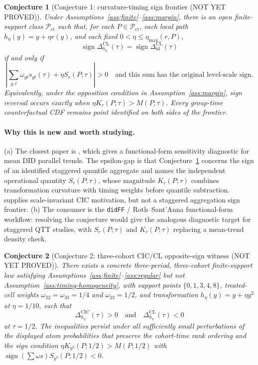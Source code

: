 \documentclass[11pt]{article}
\theoremstyle{definition}
\theoremstyle{plain}
\newtheorem{conjecture}{Conjecture}
\theoremstyle{remark}
\begin{document}
\begin{conjecture}[Conjecture 1: curvature-timing sign frontier (NOT YET PROVED)]\label{conj:curvature-frontier}
Under Assumptions~\ref{ass:finite}--\ref{ass:margin}, there is an open
finite-support class \(\mathcal P_{\mathrm{ct}}\) such that, for each
\(P\in\mathcal P_{\mathrm{ct}}\), each local path \(h_\eta(y)=y+\eta r(y)\), and
each fixed \(0<\eta\le\eta_{\max}(r,P)\),
\[
\operatorname{sign}\Delta^{\mathrm{CL}}_{h_\eta}(\tau)
=\operatorname{sign}\Delta^{\mathrm{CL}}_{\mathrm{id}}(\tau)
\]
if and only if
\[
\left|\sum_{g,t}\omega_{gt}s_{gt}(\tau)+\eta S_r(P;\tau)\right|>0
\quad\text{and this sum has the original level-scale sign.}
\]
Equivalently, under the opposition condition in Assumption~\ref{ass:margin},
sign reversal occurs exactly when \(\eta K_r(P;\tau)>M(P;\tau)\).  Every
group-time counterfactual CDF remains point identified on both sides of the
frontier.
\end{conjecture}
\paragraph{Why this is new and worth studying.}
(a) The closest paper is \citet{RothSantAnna2023}, which gives a functional-form
sensitivity diagnostic for mean DID parallel trends.  The epsilon-gap is that
Conjecture~\ref{conj:curvature-frontier} concerns the sign of an identified
staggered quantile aggregate and names the independent operational quantity
\(S_r(P;\tau)\), whose magnitude \(K_r(P;\tau)\) combines transformation
curvature with timing weights before quantile subtraction.  \citet{AtheyImbens2006} supplies scale-invariant CIC
motivation, but not a staggered aggregation sign frontier.  (b) The consumer is
the \texttt{didFF} / Roth--Sant'Anna functional-form workflow: resolving the
conjecture would give the analogous diagnostic target for staggered QTT studies,
with \(S_r(P;\tau)\) and \(K_r(P;\tau)\) replacing a mean-trend density check.

\begin{conjecture}[Conjecture 2: three-cohort CIC/CL opposite-sign witness (NOT YET PROVED)]\label{conj:witness}
There exists a concrete three-period, three-cohort finite-support law satisfying
Assumptions~\ref{ass:finite}--\ref{ass:regular} but not
Assumption~\ref{ass:timing-homogeneity}, with support points
\(\{0,1,3,4,8\}\), treated-cell weights
\(\omega_{22}=\omega_{33}=1/4\) and \(\omega_{23}=1/2\), and transformation
\(h_\eta(y)=y+\eta y^2\) at \(\eta=1/10\), such that
\[
\Delta^{\mathrm{CIC}}_{h_\eta}(\tau)>0
\quad\text{and}\quad
\Delta^{\mathrm{CL}}_{h_\eta}(\tau)<0
\]
at \(\tau=1/2\).  The inequalities persist under all sufficiently small
perturbations of the displayed atom probabilities that preserve the cohort-time
rank ordering and the sign condition \(\eta K_{y^2}(P;1/2)>M(P;1/2)\) with
\(\operatorname{sign}(\sum\omega s)S_{y^2}(P;1/2)<0\).
\end{conjecture}
\end{document}
